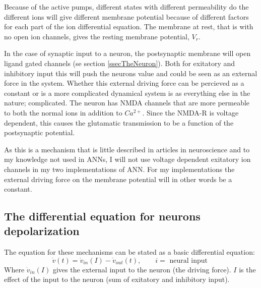 Because of the active pumps, different states with different permeability do the different ions will give different membrane potential because of different factors for each part of the ion differential equation. 
The membrane at rest, that is with no open ion channels, gives the resting membrane potential, $V_r$. 

In the case of synaptic input to a neuron, the postsynaptic membrane will open ligand gated channels (se section \ref{ssecTheNeuron}). 
Both for exitatory and inhibitory input this will push the neurons value and could be seen as an external force in the system.
Whether this external driving force can be percieved as a constant or is a more complicated dynamical system is as everything else in the nature; complicated. %
The neuron has NMDA channels that are more permeable to both the normal ions in addition to $Ca^{2+}$. Since the NMDA-R is voltage dependent, this causes the glutamatic transmission to be a function of the postsynaptic potential.

As this is a mechanism that is little described in articles in neuroscience and to my knowledge not used in ANNs, I will not use voltage dependent exitatory ion channels in my two implementations of ANN. 
For my implementations the external driving force on the membrane potential will in other words be a constant.



\subsection{The differential equation for neurons depolarization}
The equation for these mechanisms can be stated as a basic differential equation:
\begin{equation}
	\dot{v}(t) = \dot{v}_{in}(I) - \dot{v}_{out}(t), \qquad i = \text{ neural input }
\end{equation}
Where $\dot{v}_{in}(I)$ gives the external input to the neuron (the driving force). %
$I$ is the effect of the input to the neuron (sum of exitatory and inhibitory input).

